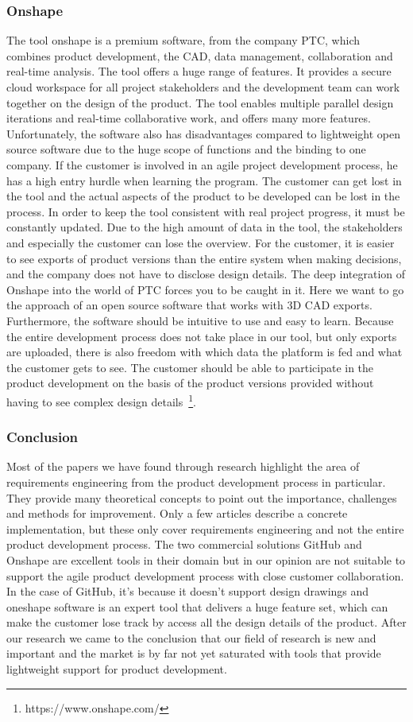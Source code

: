     \subsubsection*{Onshape}
    The tool onshape is a premium software, from the company PTC, which combines product development, the CAD, data management, collaboration and real-time analysis. The tool offers a huge range of features. It provides a secure cloud workspace for all project stakeholders and the development team can work together on the design of the product. The tool enables multiple parallel design iterations and real-time collaborative work, and offers many more features. 
    Unfortunately, the software also has disadvantages compared to lightweight open source software due to the huge scope of functions and the binding to one company. If the customer is involved in an agile project development process, he has a high entry hurdle when learning the program. The customer can get lost in the tool and the actual aspects of the product to be developed can be lost in the process. In order to keep the tool consistent with real project progress, it must be constantly updated. Due to the high amount of data in the tool, the stakeholders and especially the customer can lose the overview. For the customer, it is easier to see exports of product versions than the entire system when making decisions, and the company does not have to disclose design details. The deep integration of Onshape into the world of PTC forces you to be caught in it. 
    Here we want to go the approach of an open source software that works with 3D CAD exports. Furthermore, the software should be intuitive to use and easy to learn. Because the entire development process does not take place in our tool, but only exports are uploaded, there is also freedom with which data the platform is fed and what the customer gets to see. The customer should be able to participate in the product development on the basis of the product versions provided without having to see complex design details~\footnote{https://www.onshape.com/}.

    \subsubsection*{Conclusion}
    Most of the papers we have found through research highlight the area of requirements engineering from the product development process in particular. They provide many theoretical concepts to point out the importance, challenges and methods for improvement. Only a few articles describe a concrete implementation, but these only cover requirements engineering and not the entire product development process. The two commercial solutions GitHub and Onshape are excellent tools in their domain but in our opinion are not suitable to support the agile product development process with close customer collaboration. In the case of GitHub, it's because it doesn't support design drawings and oneshape software is an expert tool that delivers a huge feature set, which can make the customer lose track by access all the design details of the product. After our research we came to the conclusion that our field of research is new and important and the market is by far not yet saturated with tools that provide lightweight support for product development.
